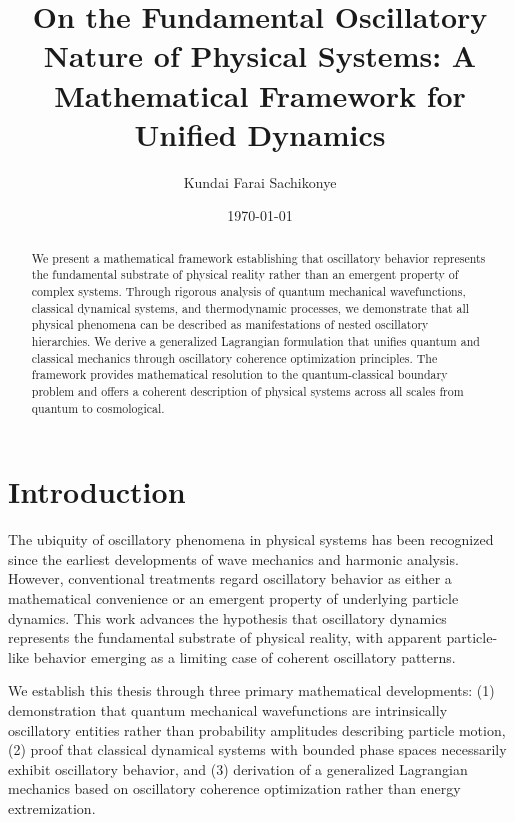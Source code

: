 \documentclass[11pt]{article}
\title{On the Fundamental Oscillatory Nature of Physical Systems: A Mathematical Framework for Unified Dynamics}
\author{Kundai Farai Sachikonye}
\date{\today}
\theoremstyle{remark}
\begin{document}
\maketitle

\begin{abstract}
We present a mathematical framework establishing that oscillatory behavior represents the fundamental substrate of physical reality rather than an emergent property of complex systems. Through rigorous analysis of quantum mechanical wavefunctions, classical dynamical systems, and thermodynamic processes, we demonstrate that all physical phenomena can be described as manifestations of nested oscillatory hierarchies. We derive a generalized Lagrangian formulation that unifies quantum and classical mechanics through oscillatory coherence optimization principles. The framework provides mathematical resolution to the quantum-classical boundary problem and offers a coherent description of physical systems across all scales from quantum to cosmological.
\end{abstract}

\section{Introduction}

The ubiquity of oscillatory phenomena in physical systems has been recognized since the earliest developments of wave mechanics and harmonic analysis. However, conventional treatments regard oscillatory behavior as either a mathematical convenience or an emergent property of underlying particle dynamics. This work advances the hypothesis that oscillatory dynamics represents the fundamental substrate of physical reality, with apparent particle-like behavior emerging as a limiting case of coherent oscillatory patterns.

We establish this thesis through three primary mathematical developments: (1) demonstration that quantum mechanical wavefunctions are intrinsically oscillatory entities rather than probability amplitudes describing particle motion, (2) proof that classical dynamical systems with bounded phase spaces necessarily exhibit oscillatory behavior, and (3) derivation of a generalized Lagrangian mechanics based on oscillatory coherence optimization rather than energy extremization.
\end{document}

